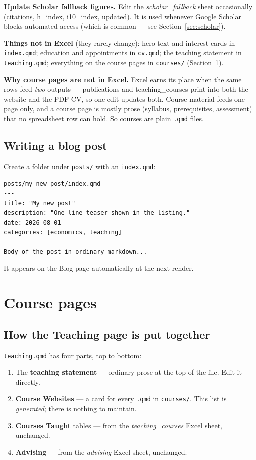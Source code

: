 \documentclass[11pt,a4paper]{article}
\newcommand{\file}[1]{\texttt{#1}}
\begin{document}
\textbf{Update Scholar fallback figures.} Edit the \emph{scholar\_fallback}
sheet occasionally (citations, h\_index, i10\_index, updated). It is used
whenever Google Scholar blocks automated access (which is common --- see
Section~\ref{sec:scholar}).

\textbf{Things not in Excel} (they rarely change): hero text and interest
cards in \file{index.qmd}; education and appointments in \file{cv.qmd};
the teaching statement in \file{teaching.qmd}; everything on the course
pages in \file{courses/} (Section~\ref{sec:courses}).

\textbf{Why course pages are not in Excel.} Excel earns its place when the
same rows feed \emph{two} outputs --- publications and teaching\_courses
print into both the website and the PDF CV, so one edit updates both. Course
material feeds one page only, and a course page is mostly prose (syllabus,
prerequisites, assessment) that no spreadsheet row can hold. So courses are
plain \file{.qmd} files.

\subsection{Writing a blog post}

Create a folder under \file{posts/} with an \file{index.qmd}:

\begin{lstlisting}
posts/my-new-post/index.qmd
---
title: "My new post"
description: "One-line teaser shown in the listing."
date: 2026-08-01
categories: [economics, teaching]
---
Body of the post in ordinary markdown...
\end{lstlisting}

It appears on the Blog page automatically at the next render.

\section{Course pages}\label{sec:courses}

\subsection{How the Teaching page is put together}

\file{teaching.qmd} has four parts, top to bottom:

\begin{enumerate}[itemsep=1pt]
  \item The \textbf{teaching statement} --- ordinary prose at the top of the
        file. Edit it directly.
  \item \textbf{Course Websites} --- a card for every \file{.qmd} in
        \file{courses/}. This list is \emph{generated}; there is nothing to
        maintain.
  \item \textbf{Courses Taught} tables --- from the \emph{teaching\_courses}
        Excel sheet, unchanged.
  \item \textbf{Advising} --- from the \emph{advising} Excel sheet, unchanged.
\end{enumerate}
\end{document}
